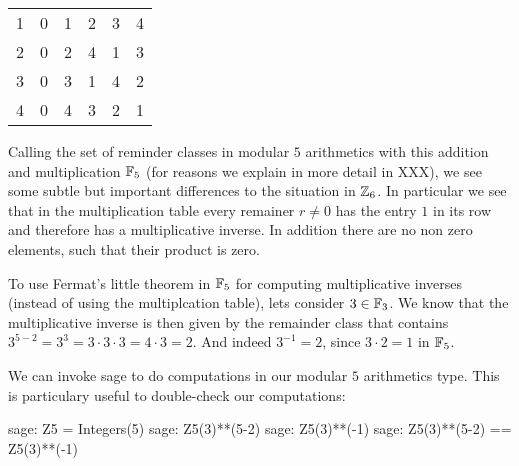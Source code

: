 \begin{example} 
\begin{center}
\begin{tabular}{c | c c c c c}
      1 & 0 & 1 & 2 & 3 & 4 \\
      2 & 0 & 2 & 4 & 1 & 3 \\
      3 & 0 & 3 & 1 & 4 & 2 \\
      4 & 0 & 4 & 3 & 2 & 1 \\
  \end{tabular}
\end{center}
Calling the set of reminder classes in modular $5$ arithmetics with this addition and multiplication $\mathbb{F}_5$ (for reasons we explain in more detail in XXX), we see some subtle but important differences to the situation in $\mathbb{Z}_6$. In particular we see that in the multiplication table every remainer $r\neq 0$ has the entry $1$ in its row and therefore has a multiplicative inverse. In addition there are no non zero elements, such that their product is zero.

To use Fermat's little theorem in $\mathbb{F}_5$ for computing multiplicative inverses (instead of using the multiplcation table), lets consider $3\in\mathbb{F}_3$. We know that the multiplicative inverse is then given by the remainder class that contains $3^{5-2}=3^3=3\cdot 3\cdot 3= 4\cdot 3 = 2$. And indeed $3^{-1}=2$, since $3\cdot 2 =1$ in $\mathbb{F}_5$.

We can invoke sage to do computations in our modular $5$ arithmetics type. This is particulary useful to double-check our computations:
\begin{sagecommandline}
sage: Z5 = Integers(5)
sage: Z5(3)**(5-2)
sage: Z5(3)**(-1)
sage: Z5(3)**(5-2) == Z5(3)**(-1)
\end{sagecommandline}
\end{example}
